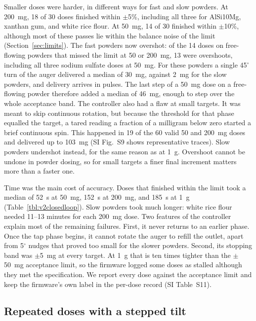 \documentclass[twoside,twocolumn,9pt]{article}
\begin{document}
Smaller doses were harder, in different ways for fast and slow powders. At 200~mg, 18 of 30 doses finished within $\pm$5\%, including all three for AlSi10Mg, xanthan gum, and white rice flour. At 50~mg, 14 of 30 finished within $\pm$10\%, although most of these passes lie within the balance noise of the limit (Section~\ref{sec:limits}). The fast powders now overshot: of the 14 doses on free-flowing powders that missed the limit at 50 or 200~mg, 13 were overshoots, including all three sodium sulfate doses at 50~mg. For these powders a single 45$^\circ$ turn of the auger delivered a median of 30~mg, against 2~mg for the slow powders, and delivery arrives in pulses. The last step of a 50~mg dose on a free-flowing powder therefore added a median of 46~mg, enough to step over the whole acceptance band. The controller also had a flaw at small targets. It was meant to skip continuous rotation, but because the threshold for that phase equalled the target, a tared reading a fraction of a milligram below zero started a brief continuous spin. This happened in 19 of the 60 valid 50 and 200~mg doses and delivered up to 103~mg (SI Fig.~S9 shows representative traces). Slow powders undershot instead, for the same reason as at 1~g. Overshoot cannot be undone in powder dosing, so for small targets a finer final increment matters more than a faster one.

Time was the main cost of accuracy. Doses that finished within the limit took a median of 52~s at 50~mg, 152~s at 200~mg, and 185~s at 1~g (Table~\ref{tbl:v2closedloop}). Slow powders took much longer: white rice flour needed 11--13 minutes for each 200~mg dose. Two features of the controller explain most of the remaining failures. First, it never returns to an earlier phase. Once the tap phase begins, it cannot rotate the auger to refill the outlet, apart from 5$^\circ$ nudges that proved too small for the slower powders. Second, its stopping band was $\pm$5~mg at every target. At 1~g that is ten times tighter than the $\pm$50~mg acceptance limit, so the firmware logged some doses as stalled although they met the specification. We report every dose against the acceptance limit and keep the firmware's own label in the per-dose record (SI Table~S11).

\subsection{Repeated doses with a stepped tilt}
\label{sec:stepped}
\end{document}
